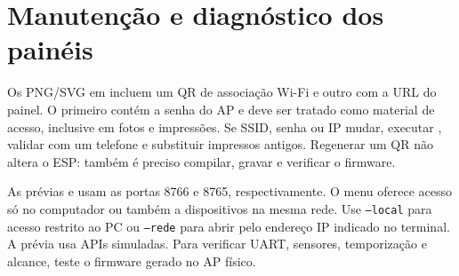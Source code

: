 \section{Manutenção e diagnóstico dos painéis}\label{sec:qr-paineis}
Os PNG/SVG em  incluem um QR de associação Wi-Fi e outro com a URL do painel. O primeiro contém a senha do AP e deve ser tratado como material de acesso, inclusive em fotos e impressões. Se SSID, senha ou IP mudar, executar , validar com um telefone e substituir impressos antigos. Regenerar um QR não altera o ESP: também é preciso compilar, gravar e verificar o firmware.

As prévias  e  usam as portas 8766 e 8765, respectivamente. O menu oferece acesso só no computador ou também a dispositivos na mesma rede. Use \texttt{--local} para acesso restrito ao PC ou \texttt{--rede} para abrir pelo endereço IP indicado no terminal. A prévia usa APIs simuladas. Para verificar UART, sensores, temporização e alcance, teste o firmware gerado no AP físico.


